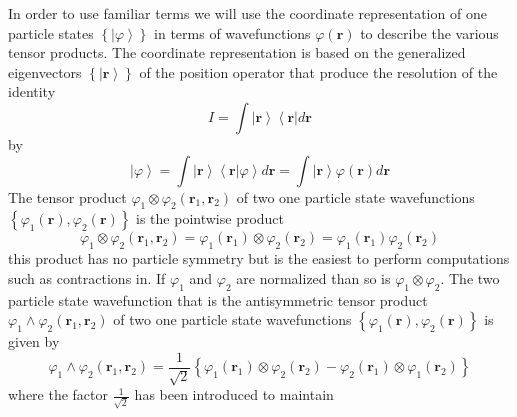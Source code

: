 \documentclass[aps,preprint]{revtex4}%
\begin{document}
In order to use familiar terms we will use the coordinate representation of
one particle states $\left\{  \left\vert \varphi\right\rangle \right\}  $ in
terms of wavefunctions $\varphi\left(  \mathbf{r}\right)  $ to describe the
various tensor products. The coordinate representation is based on the
generalized eigenvectors $\left\{  \left\vert \mathbf{r}\right\rangle
\right\}  $ of the position operator that produce the resolution of the
identity
\begin{equation}
I=\int\left\vert \mathbf{r}\right\rangle \left\langle \mathbf{r}\right\vert
d\mathbf{r}%
\end{equation}
by%
\begin{equation}
\left\vert \varphi\right\rangle =\int\left\vert \mathbf{r}\right\rangle
\left\langle \mathbf{r}|\varphi\right\rangle d\mathbf{r=}\int\left\vert
\mathbf{r}\right\rangle \varphi\left(  \mathbf{r}\right)  d\mathbf{r}%
\end{equation}
The tensor product $\varphi_{1}\otimes\varphi_{2}\left(  \mathbf{r}%
_{1},\mathbf{r}_{2}\right)  $ of two one particle state wavefunctions
$\left\{  \varphi_{1}\left(  \mathbf{r}\right)  ,\varphi_{2}\left(
\mathbf{r}\right)  \right\}  $ is the pointwise product
\begin{equation}
\varphi_{1}\otimes\varphi_{2}\left(  \mathbf{r}_{1},\mathbf{r}_{2}\right)
=\varphi_{1}\left(  \mathbf{r}_{1}\right)  \otimes\varphi_{2}\left(
\mathbf{r}_{2}\right)  =\varphi_{1}\left(  \mathbf{r}_{1}\right)  \varphi
_{2}\left(  \mathbf{r}_{2}\right)
\end{equation}
this product has no particle symmetry but is the easiest to perform
computations such as contractions in. If $\varphi_{1}$ and $\varphi_{2}$ are
normalized than so is $\varphi_{1}\otimes\varphi_{2}$. The two particle state
wavefunction that is the antisymmetric tensor product $\varphi_{1}%
\wedge\varphi_{2}\left(  \mathbf{r}_{1},\mathbf{r}_{2}\right)  $ of two one
particle state wavefunctions $\left\{  \varphi_{1}\left(  \mathbf{r}\right)
,\varphi_{2}\left(  \mathbf{r}\right)  \right\}  $ is given by
\begin{equation}
\varphi_{1}\wedge\varphi_{2}\left(  \mathbf{r}_{1},\mathbf{r}_{2}\right)
=\frac{1}{\sqrt{2}}\left\{  \varphi_{1}\left(  \mathbf{r}_{1}\right)
\otimes\varphi_{2}\left(  \mathbf{r}_{2}\right)  -\varphi_{2}\left(
\mathbf{r}_{1}\right)  \otimes\varphi_{1}\left(  \mathbf{r}_{2}\right)
\right\}  \label{aten}%
\end{equation}
where the factor $\frac{1}{\sqrt{2}}$ has been introduced to maintain
\end{document}
